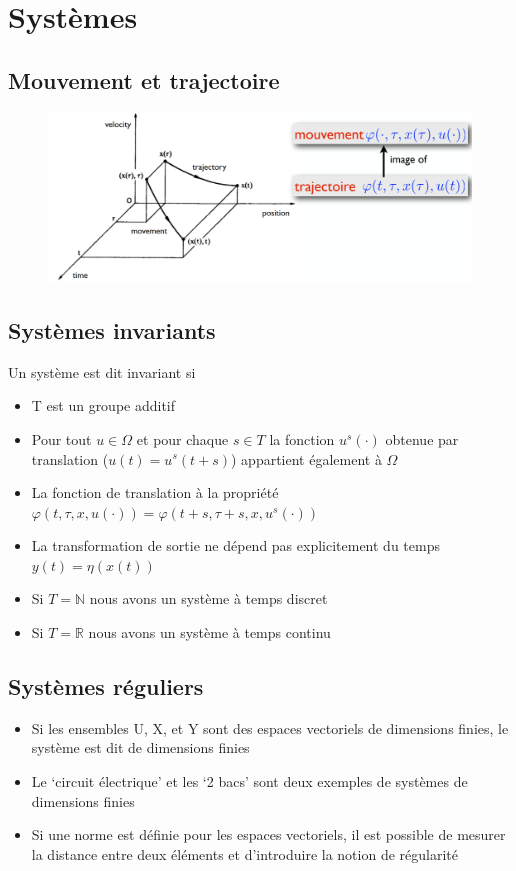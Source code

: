 \documentclass[resume]{subfiles}
\begin{document}
\section{Systèmes}

\subsection{Mouvement et trajectoire}

\begin{figure}[H]
    \centering
    \includegraphics[width=1\columnwidth]{Figures/MouvTraj.png}
\end{figure}

\subsection{Systèmes invariants}

Un système est dit invariant si
\begin{itemize}
\item T est un groupe additif
\item Pour tout $u \in \Omega$ et pour chaque $s \in T$  la fonction $u^s(\cdot)$ obtenue par
  translation ($u(t)=u^s(t+s)$) appartient également à $\Omega$
\item La fonction de translation à la propriété
  $\varphi(t,\tau,x,u(\cdot))=\varphi(t+s,\tau +s,x,u^s(\cdot))$ 
\item La transformation de sortie ne dépend pas explicitement du temps
  $y(t) = \eta(x(t))$ 
\item Si $T=\mathbb{N}$ nous avons un système à temps discret
\item Si $T=\mathbb{R}$ nous avons un système à temps continu  
\end{itemize}

\subsection{Systèmes réguliers}
\begin{itemize}
\item Si les ensembles U, X, et Y sont des espaces vectoriels de
  dimensions finies, le système est dit de dimensions finies
\item Le ‘circuit électrique’ et les ‘2 bacs’ sont deux exemples de
  systèmes de dimensions finies
\item Si une norme est définie pour les espaces vectoriels, il est
  possible de mesurer la distance entre deux éléments et
  d’introduire la notion de régularité  
\end{itemize}
\end{document}
